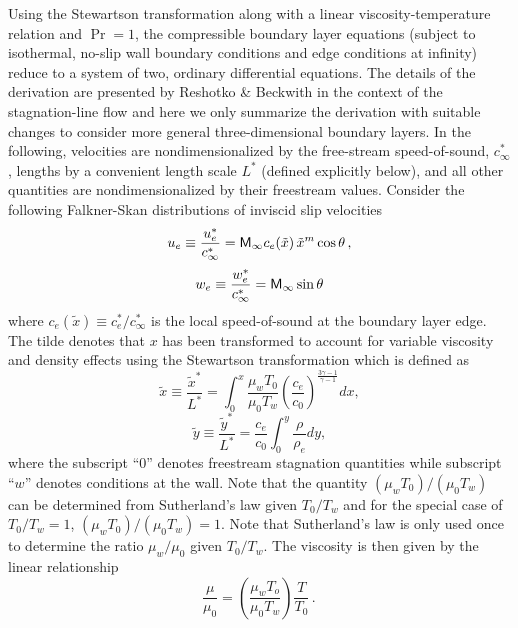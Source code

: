 Using the Stewartson transformation along with a linear viscosity-temperature
relation and $\Pr=1$, the compressible boundary layer equations (subject to
isothermal, no-slip wall boundary conditions and edge conditions at infinity)
reduce to a system of two, ordinary differential equations.  The details of the
derivation are presented by Reshotko \& Beckwith \cite{ReBe:58} in the context
of the stagnation-line flow and here we only summarize the derivation with
suitable changes to consider more general three-dimensional boundary layers.
In the following, velocities are nondimensionalized by the free-stream
speed-of-sound, $c_\infty^*$, lengths by a convenient length scale $L^*$
(defined explicitly below), and all other quantities are nondimensionalized by
their freestream values.  Consider the following Falkner-Skan distributions of
inviscid slip velocities
%
\begin{equation} \label{e:uedge}
  u_e \equiv \frac{u^*_e}{c_\infty^*} = {\sf M}_\infty c_e(\tilde x) \, 
                                   {\tilde x}^m \cos\theta  {\, ,}
\end{equation}
%
\begin{equation} \label{e:wedge}
  w_e \equiv \frac{w^*_e}{c_\infty^*}  = {\sf M}_\infty \sin\theta
\end{equation}
%
where $c_e(\tilde x) \equiv c^*_e / c^*_\infty$ is the local speed-of-sound at
the boundary layer edge.  The tilde denotes that $x$ has been transformed to
account for variable viscosity and density effects using the Stewartson
transformation \cite{Stewartson:64} which is defined as
%
\begin{equation}
  \tilde x \equiv \frac{\tilde x^*}{L^*} = 
	\int_0^{x} \frac{\mu_w T_0}{\mu_0 T_w}
	\left(\frac{c_e}{c_0}\right)^\frac{3\gamma-1}{\gamma-1} dx \comma
\end{equation}
%
\begin{equation}
  \tilde y \equiv \frac{\tilde y^*}{L^*} = \frac{c_e}{c_0} 
	\int_0^y \frac{\rho}{\rho_e} dy  \comma
\end{equation}
%
where the subscript ``$0$'' denotes freestream stagnation quantities while
subscript ``$w$'' denotes conditions at the wall.  Note that the quantity
$(\mu_w T_0)/(\mu_0 T_w)$ can be determined from Sutherland's law given
$T_0/T_w$ and for the special case of $T_0/T_w = 1$, $(\mu_w T_0)/(\mu_0 T_w)
= 1$.  Note that Sutherland's law is only used once to determine the ratio
$\mu_w/\mu_0$ given $T_0/T_w$.  The viscosity is then given by the linear
relationship
%
\begin{equation}
  \frac{\mu}{\mu_0} = \left(\frac{\mu_w T_o}{\mu_0 T_w}\right)
  \frac{T}{T_0} \period
\end{equation}

